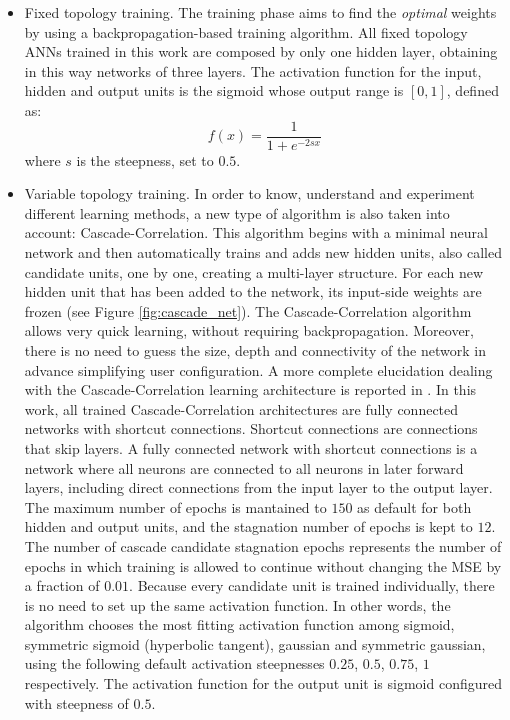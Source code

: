 \begin{itemize}
 \item Fixed topology training. The training phase aims to find the \emph{optimal} weights by using a backpropagation-based training algorithm. All fixed topology ANNs trained in this work are composed by only one hidden layer, obtaining in this way networks of three layers. The activation function for the input, hidden and output units is the sigmoid whose output range is $[0, 1]$, defined as:
 \begin{equation}
  	f(x) = \frac{1}{1 + e^{-2sx}}
 \end{equation}
where $s$ is the steepness, set to $0.5$.
 \item Variable topology training. In order to know, understand and experiment different learning methods, a new type of algorithm is also taken into account: Cascade-Correlation. This algorithm begins with a minimal neural network and then automatically trains and adds new hidden units, also called candidate units, one by one, creating a multi-layer structure. For each new hidden unit that has been added to the network, its input-side weights are frozen (see Figure \ref{fig:cascade_net}). The Cascade-Correlation algorithm allows very quick learning, without requiring backpropagation. Moreover, there is no need to guess the size, depth and connectivity of the network in advance simplifying user configuration. A more complete elucidation dealing with the Cascade-Correlation learning architecture is reported in \cite{Fahlman1990}. In this work, all trained Cascade-Correlation architectures are fully connected networks with shortcut connections. Shortcut connections are connections that skip layers.  A fully connected network with shortcut connections is a network where all neurons are connected to all neurons in later forward layers, including direct connections from the input layer to the output layer. The maximum number of epochs is mantained to $150$ as default for both hidden and output units, and the stagnation number of epochs is kept to $12$. The number of cascade candidate stagnation epochs represents the number of epochs in which training is allowed to continue without changing the MSE by a fraction of $0.01$. Because every candidate unit is trained individually, there is no need to set up the same activation function. In other words, the algorithm chooses the most fitting activation function among sigmoid, symmetric sigmoid (hyperbolic tangent), gaussian and symmetric gaussian, using the following default activation steepnesses $0.25$, $0.5$, $0.75$, $1$ respectively. The activation function for the output unit is sigmoid configured with steepness of $0.5$.
\end{itemize}
